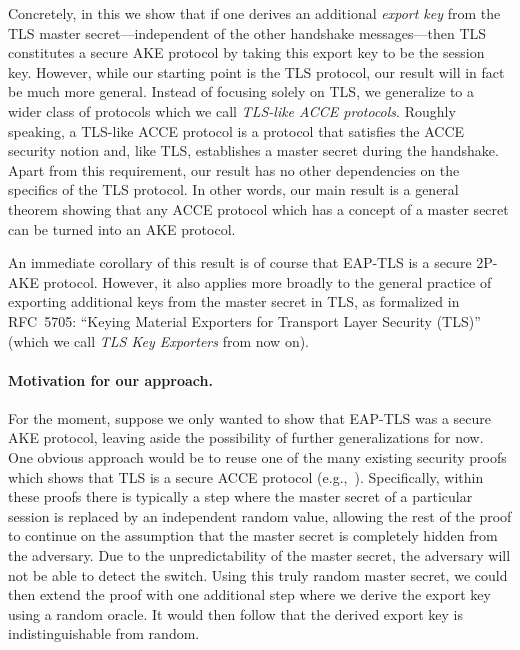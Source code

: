 Concretely,
in this  we show that if one derives an additional \emph{export key} from the TLS master secret---independent 
of the other handshake messages---then TLS constitutes a secure AKE protocol by taking this export key to be the session key.  
However, while our starting point is the TLS protocol, 
our result will in fact be much more general.
Instead of focusing solely on TLS,
we generalize to a wider class of protocols which we call \emph{TLS-like ACCE protocols}.  
Roughly speaking, 
a TLS-like ACCE protocol is a protocol that satisfies the ACCE security notion and, 
like TLS, establishes a master secret during the handshake.
Apart from this requirement, our result has no other dependencies on the specifics of the TLS protocol.
In other words, our main result is a general theorem showing that any ACCE protocol which has a concept of a master secret can be turned into an AKE protocol.

An immediate corollary of this result is of course that EAP-TLS is a secure 2P-AKE protocol.
However,
it also applies more broadly to the general practice of exporting additional keys from the master secret in TLS,
as formalized in RFC~5705: ``Keying Material Exporters for Transport Layer Security (TLS)''~\cite{IETF:RFC5705:TLS-key-exporters}
(which we call \emph{TLS Key Exporters} from now on).




\paragraph{Motivation for our approach.}
For the moment,
suppose we only wanted to show that EAP-TLS was a secure AKE protocol,
leaving aside the possibility of further generalizations for now.
One obvious approach would be to reuse one of the many existing security proofs which shows that TLS is a secure ACCE protocol 
(e.g.,~\cite{C:JKSS12,EPRINT:KohSchSch13,PKC:LSYKS14}).
Specifically,
within these proofs there is typically a step where the master secret of a particular session is replaced by an independent random value,
allowing the rest of the proof to continue on the assumption that the master secret is completely hidden from the adversary.
Due to the unpredictability of the master secret,
the adversary will not be able to detect the switch.
Using this truly random master secret,
we could then extend the proof with one additional step where we derive the export key using a random oracle.
It would then follow that the derived export key is indistinguishable from random. 

